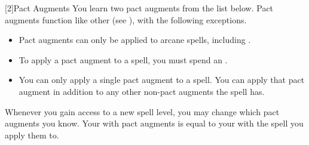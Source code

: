         [2]{Pact Augments} You learn two pact augments from the list below.
        Pact augments function like other  (see ), with the following exceptions.
        \begin{itemize}
            \item Pact augments can only be applied to arcane spells, including .
            \item To apply a pact augment to a spell, you must spend an .
            \item You can only apply a single pact augment to a spell.
                You can apply that pact augment in addition to any other non-pact augments the spell has.
        \end{itemize}
        Whenever you gain access to a new spell level, you may change which pact augments you know.
        Your  with pact augments is equal to your  with the spell you apply them to.

